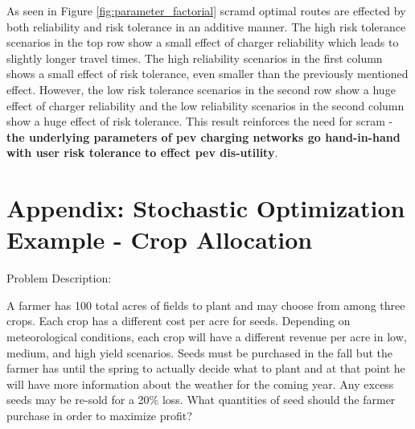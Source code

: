 \documentclass[12pt]{article}
\begin{document}
As seen in Figure \ref{fig:parameter_factorial} \gls{scramd} optimal routes are effected by both reliability and risk tolerance in an additive manner. The high risk tolerance scenarios in the top row show a small effect of charger reliability which leads to slightly longer travel times. The high reliability scenarios in the first column shows a small effect of risk tolerance, even smaller than the previously mentioned effect. However, the low risk tolerance scenarios in the second row show a huge effect of charger reliability and the low reliability scenarios in the second column show a huge effect of risk tolerance. This result reinforces the need for \gls{scram} - \textbf{the underlying parameters of \gls{pev} charging networks go hand-in-hand with user risk tolerance to effect \gls{pev} dis-utility}.

\bigskip


%
%


\appendix

\section*{Appendix: Stochastic Optimization Example - Crop Allocation}

\noindent Problem Description:

\medskip

A farmer has 100 total acres of fields to plant and may choose from among three crops. Each crop has a different cost per acre for seeds. Depending on meteorological conditions, each crop will have a different revenue per acre in  low, medium, and high yield scenarios. Seeds must be purchased in the fall but the farmer has until the spring to actually decide what to plant and at that point he will have more information about the weather for the coming year. Any excess seeds may be re-sold for a 20\% loss. What quantities of seed should the farmer purchase in order to maximize profit?
\end{document}
